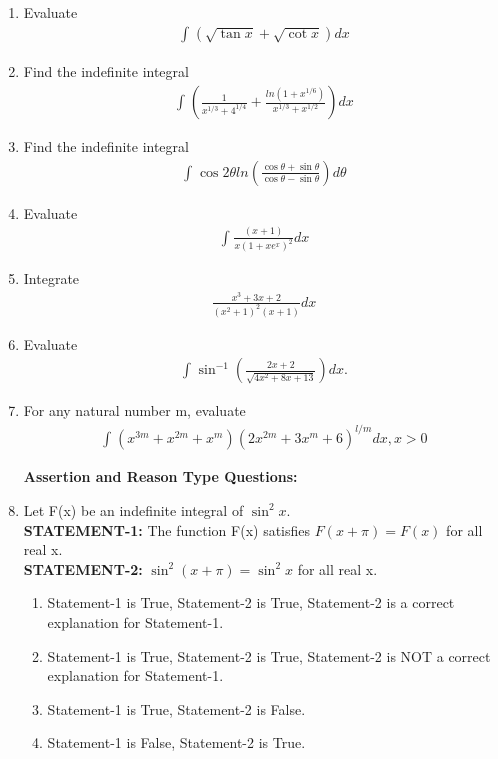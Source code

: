 \begin{enumerate}[label=\arabic*.,ref=\thesubsection.\theenumi]
\item Evaluate 
\begin{align*}
\int_{}(\sqrt{\tan x} + \sqrt{\cot x})dx
\end{align*}

\item Find the indefinite integral
\begin{align*}
\int_{}(\frac{1}{x^{1/3} + 4^{1/4}} + \frac{ln(1 + x^{1/6})}{x^{1/3} + x^{1/2}})dx
\end{align*}

\item Find the indefinite integral
\begin{align*}
\int_{}\cos 2\theta ln(\frac{\cos \theta + \sin \theta}{\cos \theta - \sin \theta})d\theta
\end{align*}

\item Evaluate 
\begin{align*}
\int_{}\frac{(x + 1)}{x(1 + xe^x)^2}dx
\end{align*}

\item Integrate 
\begin{align*}
\frac{x^3 + 3x + 2}{(x^2 + 1)^2(x + 1)}dx
\end{align*}

\item Evaluate
\begin{align*}
\int_{}\sin^{-1}(\frac{2x + 2}{\sqrt{4x^2 + 8x + 13}})dx.
\end{align*}

\item For any natural number m, evaluate
\begin{align*}
\int_{}(x^{3m} + x^{2m} + x^{m})(2x^{2m} + 3x^m + 6)^{l/m}dx, x > 0
\end{align*}

\textbf{Assertion and Reason Type Questions:}

\item Let F(x) be an indefinite integral of $\sin^{2}x$.\\
\textbf{STATEMENT-1:} The function F(x) satisfies $F(x + \pi) = F(x)$ for all real x.\\
\textbf{STATEMENT-2:} $\sin^{2}(x + \pi) = \sin^{2}x$ for all real x.
\begin{enumerate}
\item Statement-1 is True, Statement-2 is True, Statement-2 is a correct explanation for Statement-1.
\item Statement-1 is True, Statement-2 is True, Statement-2 is NOT a correct explanation for Statement-1.
\item Statement-1 is True, Statement-2 is False.
\item Statement-1 is False, Statement-2 is True.
\end{enumerate}


\end{enumerate}
